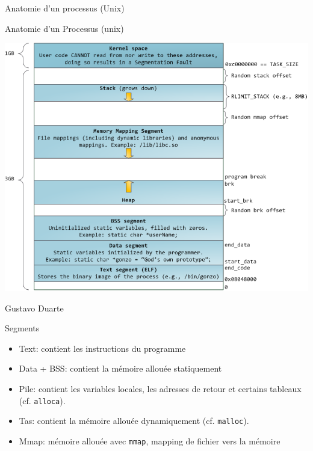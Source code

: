 \documentclass[11pt]{beamer}
\begin{document}
\begin{slide}{Anatomie d'un processus (Unix)}
\end{slide}

\begin{frame}[plain]{Anatomie d'un Processus (unix)}

\centering

\includegraphics[height=0.9\textheight]{figs/process-memory.png}

Gustavo Duarte

\end{frame}

\begin{frame}{Segments}

\begin{itemize}
\itemsep1pt\parskip0pt
\item
  Text: contient les instructions du programme
\item
  Data + BSS: contient la mémoire allouée statiquement
\item
  Pile: contient les variables locales, les adresses de retour et
  certains tableaux (cf. \texttt{alloca}).
\item
  Tas: contient la mémoire allouée dynamiquement (cf. \texttt{malloc}).
\item
  Mmap: mémoire allouée avec \texttt{mmap}, mapping de fichier vers la
  mémoire
\end{itemize}

\end{frame}
\end{document}
